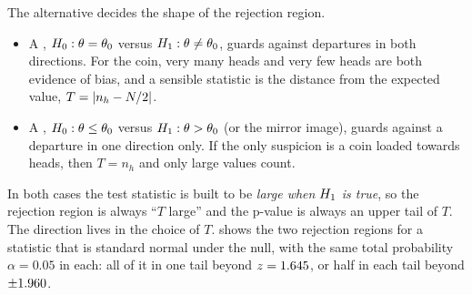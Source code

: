 The alternative decides the shape of the rejection region.
\begin{itemize}
  \item A , $H_0:\theta=\theta_0$ versus
        $H_1:\theta\neq\theta_0$, guards against departures in both
        directions. For the coin, very many heads and very few heads are both
        evidence of bias, and a sensible statistic is the distance from the
        expected value, $T=\left\lvert n_h-N/2\right\rvert$.
  \item A , $H_0:\theta\le\theta_0$ versus
        $H_1:\theta>\theta_0$ (or the mirror image), guards against a
        departure in one direction only. If the only suspicion is a coin loaded
        towards heads, then $T=n_h$ and only large values count.
\end{itemize}
In both cases the test statistic is built to be \emph{large when $H_1$ is
true}, so the rejection region is always ``$T$ large'' and the p-value is always
an upper tail of $T$. The direction lives in the choice of $T$.
 shows the two rejection regions for a statistic that is
standard normal under the null, with the same total probability $\alpha=0.05$
in each: all of it in one tail beyond $z=1.645$, or half in each
tail beyond $\pm1.960$.

